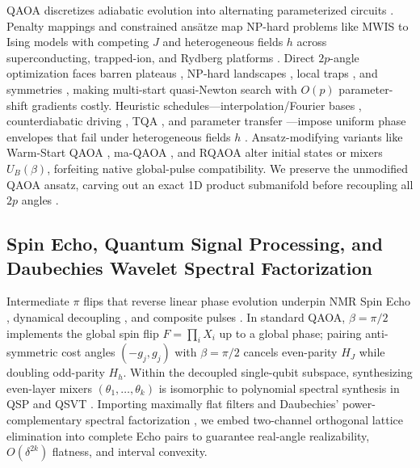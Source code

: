 \documentclass{article}
\theoremstyle{plain}
\theoremstyle{definition}
\begin{document}
QAOA \citep{farhi2014quantum} discretizes adiabatic evolution \citep{farhi2001quantum,kadowaki1998quantum} into alternating parameterized circuits \citep{blekos2024review,cerezo2021variational,preskill2018quantum}. Penalty mappings \citep{lucas2014ising} and constrained ans\"atze \citep{hadfield2019quantum} map NP-hard problems like MWIS to Ising models with competing $J$ and heterogeneous fields $h$ across superconducting, trapped-ion, and Rydberg platforms \citep{ebadi2022quantum,harrigan2021quantum,pagano2020quantum,pichler2018quantum}. Direct $2p$-angle optimization faces barren plateaus \citep{mcclean2018barren}, NP-hard landscapes \citep{bittel2021training}, local traps \citep{anschuetz2022quantum,you2021exponentially}, and symmetries \citep{lotshaw2021empirical,shaydulin2021classical}, making multi-start quasi-Newton search \citep{byrd1995limited,shaydulin2019multistart} with $O(p)$ parameter-shift gradients \citep{mitarai2018quantum,wierichs2022general} costly. Heuristic schedules---interpolation/Fourier bases \citep{crooks2018performance,zhou2020quantum}, counterdiabatic driving \citep{wurtz2022counterdiabaticity,yang2017optimizing}, TQA \citep{sack2021quantum}, and parameter transfer \citep{brandao2018fixed,galda2021transferability,shaydulin2023parameter}---impose uniform phase envelopes that fail under heterogeneous fields $h$ \citep{katial2025instance}. Ansatz-modifying variants like Warm-Start QAOA \citep{egger2021warm,tate2023warm}, ma-QAOA \citep{herrman2022multi}, and RQAOA \citep{bravyi2020obstacles} alter initial states or mixers $U_B(\beta)$, forfeiting native global-pulse compatibility. We preserve the unmodified QAOA ansatz, carving out an exact 1D product submanifold before recoupling all $2p$ angles \citep{dupont2022entanglement}.

\subsection{Spin Echo, Quantum Signal Processing, and Daubechies Wavelet Spectral Factorization}\label{subsec:2_2}

Intermediate $\pi$ flips that reverse linear phase evolution underpin NMR Spin Echo \citep{carr1954effects,hahn1950spin}, dynamical decoupling \citep{viola1999dynamical}, and composite pulses \citep{vandersypen2005nmr}. In standard QAOA, $\beta=\pi/2$ implements the global spin flip $F=\prod_i X_i$ up to a global phase; pairing anti-symmetric cost angles $(-g_j,g_j)$ with $\beta=\pi/2$ cancels even-parity $H_J$ while doubling odd-parity $H_h$. Within the decoupled single-qubit subspace, synthesizing even-layer mixers $(\theta_1,\ldots,\theta_k)$ is isomorphic to polynomial spectral synthesis in QSP and QSVT \citep{gilyen2019quantum,low2017optimal,low2016methodology}. Importing maximally flat filters and Daubechies' power-complementary spectral factorization \citep{daubechies1988orthonormal,herrmann1971approximation}, we embed two-channel orthogonal lattice elimination into complete Echo pairs to guarantee real-angle realizability, $O(\delta^{2k})$ flatness, and interval convexity.
\end{document}
